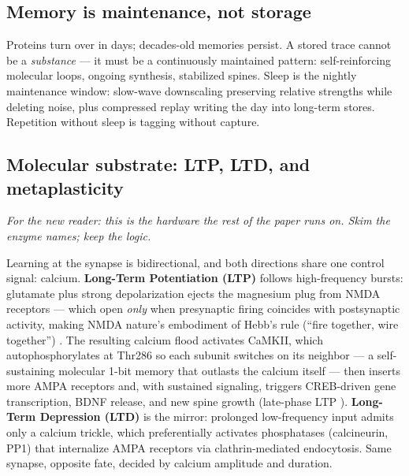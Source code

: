 \documentclass[11pt]{article}
\begin{document}
\subsection{Memory is maintenance, not storage}

Proteins turn over in days; decades-old memories persist. A stored trace cannot be a \emph{substance} --- it must be a continuously maintained pattern: self-reinforcing molecular loops, ongoing synthesis, stabilized spines. Sleep is the nightly maintenance window: slow-wave downscaling preserving relative strengths while deleting noise, plus compressed replay writing the day into long-term stores. Repetition without sleep is tagging without capture.

\subsection{Molecular substrate: LTP, LTD, and metaplasticity}

\textit{For the new reader: this is the hardware the rest of the paper runs on. Skim the enzyme names; keep the logic.}

Learning at the synapse is bidirectional, and both directions share one control signal: calcium. \textbf{Long-Term Potentiation (LTP)} follows high-frequency bursts: glutamate plus strong depolarization ejects the magnesium plug from NMDA receptors --- which open \emph{only} when presynaptic firing coincides with postsynaptic activity, making NMDA nature's embodiment of Hebb's rule (``fire together, wire together'') \citep{kandel2000}. The resulting calcium flood activates CaMKII, which autophosphorylates at Thr286 so each subunit switches on its neighbor --- a self-sustaining molecular 1-bit memory that outlasts the calcium itself --- then inserts more AMPA receptors and, with sustained signaling, triggers CREB-driven gene transcription, BDNF release, and new spine growth (late-phase LTP \citep{kandel2000}). \textbf{Long-Term Depression (LTD)} is the mirror: prolonged low-frequency input admits only a calcium trickle, which preferentially activates phosphatases (calcineurin, PP1) that internalize AMPA receptors via clathrin-mediated endocytosis. Same synapse, opposite fate, decided by calcium amplitude and duration.
\end{document}
